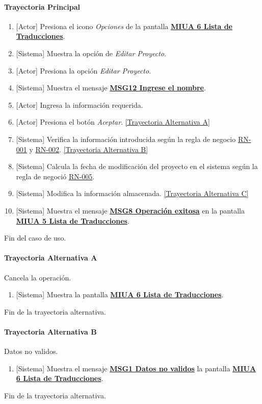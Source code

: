 \paragraph{Trayectoria Principal}
	\begin{enumerate}
	    \item {[Actor]} Presiona el icono \textit{Opciones} de la pantalla \hyperref[fig:MIUA-6]{\bf MIUA 6 Lista de Traducciones}.
	    \item {[Sistema]} Muestra la opción de \textit{Editar Proyecto}.
	    \item {[Actor]} Presiona la opción \textit{Editar Proyecto}.
	    \item {[Sistema]} Muestra el mensaje \hyperref[MSG12]{\bf MSG12 Ingrese el nombre}.
	    \item {[Actor]} Ingresa la información requerida.
	    \item {[Actor]} Presiona el botón \textit{Aceptar}. \hyperref[A-PR-CU1.1.2:TA]{[Trayectoria Alternativa A]}
	    \item {[Sistema]} Verifica la información introducida según la regla de negocio \hyperref[RN001]{RN-001} y \hyperref[RN002]{RN-002}. \hyperref[A-PR-CU1.1.2:TB]{[Trayectoria Alternativa B]}
	    \item {[Sistema]} Calcula la fecha de modificación del proyecto en el sistema según la regla de negoció \hyperref[RN005]{RN-005}.
	    \item {[Sistema]} Modifica la información almacenada. \hyperref[A-PR-CU1.1.2:TC]{[Trayectoria Alternativa C]}
	    \item {[Sistema]} Muestra el mensaje \hyperref[MSG8]{\bf MSG8 Operación exitosa} en la pantalla \hyperref[fig:MIUA-5]{\bf MIUA 5 Lista de Traducciones}.
	\end{enumerate}
	Fin del caso de uso.

\paragraph{Trayectoria Alternativa A} \label{A-PR-CU1.1.2:TA}
	Cancela la operación.
	\begin{enumerate}[label=A\arabic*.]
		\item {[Sistema]} Muestra la pantalla \hyperref[fig:MIUA-6]{\bf MIUA 6 Lista de Traducciones}.
	\end{enumerate}
	Fin de la trayectoria alternativa.
	
\paragraph{Trayectoria Alternativa B} \label{A-PR-CU1.1.2:TB}
	Datos no validos.
	\begin{enumerate}[label=B\arabic*.]
		\item {[Sistema]} Muestra el mensaje \hyperref[MSG1]{\bf MSG1 Datos no validos} la pantalla \hyperref[fig:MIUA-6]{\bf MIUA 6 Lista de Traducciones}.
	\end{enumerate}
	Fin de la trayectoria alternativa.

